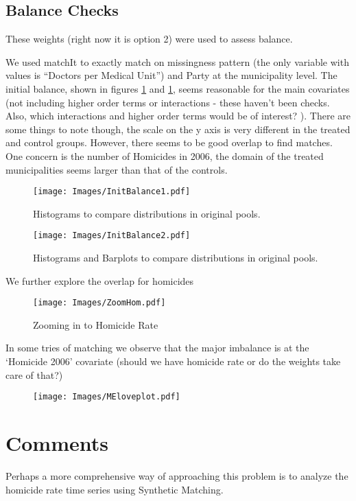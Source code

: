 \documentclass{article}[11 pt]
\begin{document}
\subsection{Balance Checks}
These weights (right now it is option 2) were used to assess balance.

We used matchIt to exactly match on missingness pattern (the only variable with values is ``Doctors per Medical Unit'') and Party at the municipality level. The initial balance, shown in figures \ref{initBalance1} and \ref{initBalance1}, seems reasonable for the main covariates (not including higher order terms or interactions - these haven't been checks. Also, which interactions and higher order terms would be of interest? ). There are some things to note though, the scale on the y axis is very different in the treated and control groups. However, there seems to be good overlap to find matches. One concern is the number of Homicides in 2006, the domain of the treated municipalities seems larger than that of the controls.

\begin{figure}[ht]

    \centering
        \texttt{[image: Images/InitBalance1.pdf]}
\caption{Histograms to compare distributions in original pools.}
\label{initBalance1}
\end{figure}

\begin{figure}[ht]

    \centering
        \texttt{[image: Images/InitBalance2.pdf]}
\caption{Histograms and Barplots  to compare distributions in original pools.}
\label{initBalance2}
\end{figure}

We further explore the overlap for homicides
\begin{figure}[ht]

    \centering
        \texttt{[image: Images/ZoomHom.pdf]}
\caption{Zooming in to Homicide Rate}
\label{ZoomHom}
\end{figure}

In some tries of matching we observe that the major imbalance is at the `Homicide 2006' covariate (should we have homicide rate or do the weights take care of that?)



\begin{figure}[ht]
    \centering
        \texttt{[image: Images/MEloveplot.pdf]}
\end{figure}

\section{Comments}
Perhaps a more comprehensive way of approaching this problem is to analyze the homicide rate time series using Synthetic Matching.

	
\end{document}
